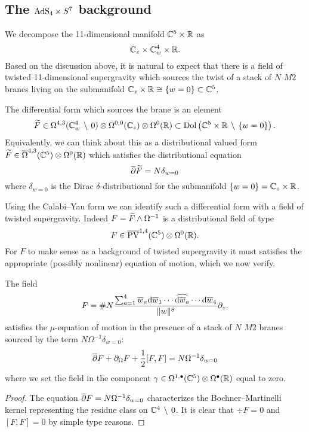 \documentclass[11pt]{amsart}
\begin{document}
\subsection{The ${\rm AdS}_4 \times S^7$ background}

\parsec[]

\parsec[]

We decompose the 11-dimensional manifold $\mathbb C^5 \times \mathbb R$ as
\[
\mathbb C_z \times \mathbb C^4_w \times \mathbb R .
\]
Based on the discussion above, it is natural to expect that there is a field of twisted 11-dimensional supergravity which sources the twist of a stack of $N$ $M2$ branes living on the submanifold $\mathbb C_z \times \mathbb R \cong \{w=0\}\subset \mathbb C^5$. 

The differential form which sources the brane is an element
\[
\widetilde{F} \in \Omega^{4,3} (\mathbb C^4_w \, \setminus \, 0) \otimes \Omega^{0,0} (\mathbb C_z) \otimes \Omega^{0} (\mathbb R) \subset \operatorname{Dol}\left(\mathbb C^5 \times \mathbb R \, \setminus \, \{w=0\}\right) .
\]
Equivalently, we can think about this as a distributional valued form $\widetilde{F} \in \overline{\Omega}^{4,3}(\mathbb C^5) \otimes \Omega^0 (\mathbb R)$ which satisfies the distributional equation
\[
\overline{\partial} \widetilde{F} = N \delta_{w=0} 
\]
where $\delta_{w=0}$ is the Dirac $\delta$-distributional for the submanifold $\{w=0\} = \mathbb C_z \times \mathbb R$. 

Using the Calabi--Yau form we can identify such a differential form with a field of twisted supergravity. 
Indeed $F = \widetilde{F} \wedge \Omega^{-1}$ is a distributional field of type
\[
F \in \overline{{\rm PV}}^{1,4}(\mathbb C^5) \otimes \Omega^0 (\mathbb R) .
\]
For $F$ to make sense as a background of twisted supergravity it must satisfies the appropriate (possibly nonlinear) equation of motion, which we now verify. 

\begin{lem}
The field 
\[
F = \# N \frac{\sum_{a=1}^4 \overline{w}_a {\rm d} \overline{w}_1 \cdots \widehat{{\rm d} \overline{w}_a} \cdots {\rm d} \overline{w}_4}{\|w\|^{8}} \partial_z .
\]
satisfies the $\mu$-equation of motion in the presence of a stack of $N$ $M2$ branes sourced by the term $N \Omega^{-1} \delta_{w=0}$:
\[
\overline{\partial} F + \partial_{\Omega} F + \frac12 [F, F] = N \Omega^{-1} \delta_{w=0} 
\]
where we set the field in the component $\gamma \in \Omega^{1,\bullet}(\mathbb C^5) \otimes \Omega^\bullet(\mathbb R)$ equal to zero. 
\end{lem}

\begin{proof}
The equation $\overline{\partial} F = N \Omega^{-1} \delta_{w=0}$ characterizes the Bochner--Martinelli kernel representing the residue class on $\mathbb C^4 \, \setminus \, 0$. 
It is clear that $\div F = 0$ and $[F, F] = 0$ by simple type reasons. 
\end{proof}
\end{document}
